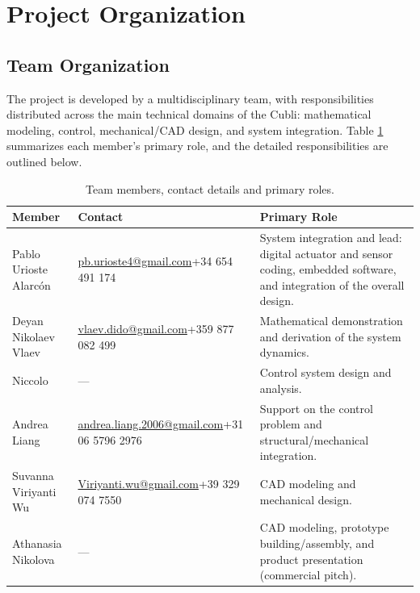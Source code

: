 \section{Project Organization}

\subsection{Team Organization}

The project is developed by a multidisciplinary team, with responsibilities
distributed across the main technical domains of the Cubli: mathematical
modeling, control, mechanical/CAD design, and system integration. Table
\ref{tab:team_roles} summarizes each member's primary role, and the detailed
responsibilities are outlined below.

\begin{table}[h]
\centering
\caption{Team members, contact details and primary roles.}
\label{tab:team_roles}
\small
\begin{tabular}{@{}p{3.6cm}p{4.6cm}p{6.0cm}@{}}
\toprule
\textbf{Member} & \textbf{Contact} & \textbf{Primary Role} \\
\midrule
Pablo Urioste Alarcón &
\href{mailto:pb.urioste4@gmail.com}{pb.urioste4@gmail.com}\newline +34 654 491 174 &
System integration and lead: digital actuator and sensor coding, embedded
software, and integration of the overall design. \\
\addlinespace
Deyan Nikolaev Vlaev &
\href{mailto:vlaev.dido@gmail.com}{vlaev.dido@gmail.com}\newline +359 877 082 499 &
Mathematical demonstration and derivation of the system dynamics. \\
\addlinespace
Niccolo &
--- &
Control system design and analysis. \\
\addlinespace
Andrea Liang &
\href{mailto:andrea.liang.2006@gmail.com}{andrea.liang.2006@gmail.com}\newline +31 06 5796 2976 &
Support on the control problem and structural/mechanical integration. \\
\addlinespace
Suvanna Viriyanti Wu &
\href{mailto:Viriyanti.wu@gmail.com}{Viriyanti.wu@gmail.com}\newline +39 329 074 7550 &
CAD modeling and mechanical design. \\
\addlinespace
Athanasia Nikolova &
--- &
CAD modeling, prototype building/assembly, and product presentation
(commercial pitch). \\
\bottomrule
\end{tabular}
\end{table}

